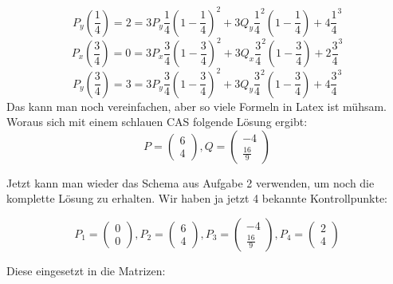 \begin{displaymath}
P_y\left(\frac{1}{4}\right) = 2 = 3 P_y \frac{1}{4}\left(1-\frac{1}{4}\right)^2+3Q_y\frac{1}{4}^2\left(1-\frac{1}{4}\right)+4\frac{1}{4}^3
\end{displaymath}
\begin{displaymath}
P_x\left(\frac{3}{4}\right) = 0 = 3 P_x \frac{3}{4}\left(1-\frac{3}{4}\right)^2+3Q_x\frac{3}{4}^2\left(1-\frac{3}{4}\right)+2\frac{3}{4}^3
\end{displaymath}
\begin{displaymath}
P_y\left(\frac{3}{4}\right) = 3 = 3 P_y \frac{3}{4}\left(1-\frac{3}{4}\right)^2+3Q_y\frac{3}{4}^2\left(1-\frac{3}{4}\right)+4\frac{3}{4}^3
\end{displaymath}
Das kann man noch vereinfachen, aber so viele Formeln in Latex ist mühsam. Woraus sich mit einem schlauen CAS folgende Lösung ergibt:
\begin{displaymath}
P = \begin{pmatrix}6 \\ 4\end{pmatrix}, Q = \begin{pmatrix}-4 \\ \frac{16}{9}\end{pmatrix}
\end{displaymath}

Jetzt kann man wieder das Schema aus Aufgabe 2 verwenden, um noch die komplette Lösung zu erhalten. Wir haben ja jetzt 4 bekannte Kontrollpunkte:

\begin{displaymath}
P_1 = \begin{pmatrix}0 \\ 0\end{pmatrix}, P_2 = \begin{pmatrix}6 \\ 4\end{pmatrix}, P_3 = \begin{pmatrix}-4 \\ \frac{16}{9}\end{pmatrix}, P_4 = \begin{pmatrix}2 \\ 4\end{pmatrix}
\end{displaymath}

Diese eingesetzt in die Matrizen:


